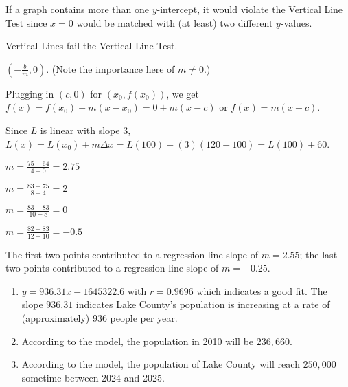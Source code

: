 \begin{exenum}
\item If a graph contains more than one $y$-intercept, it would violate the Vertical Line Test since $x=0$ would be matched with (at least) two different $y$-values.

\item  Vertical Lines fail the Vertical Line Test.

\item  $\left(- \frac{b}{m}, 0 \right)$.  (Note the importance here of $m \neq 0$.)

\item Plugging in $(c,0)$ for $(x_{0}, f(x_{0}))$, we get $f(x) = f(x_{0}) + m (x - x_{0}) = 0 + m(x-c)$ or $f(x) = m(x-c)$.

\item Since $L$ is linear with slope $3$, $L(x) = L(x_{0}) + m \Delta x = L(100) + (3)(120-100) = L(100)+60$.

\item


\begin{shortenumerate}

\item $m = \frac{75-64}{4-0} = 2.75$

\item $m = \frac{83-75}{8-4} = 2$


\item  $m = \frac{83-83}{10-8} = 0$

\item  $m = \frac{82-83}{12-10} = -0.5$

\end{shortenumerate}

The first two points contributed to a regression line slope of $m = 2.55$;  the last two points contributed to a regression line slope of $m=-0.25$.

\item  \begin{enumerate}

\item  $y = 936.31x - 1645322.6$ with $r=0.9696$ which indicates a good fit.  The slope $936.31$ indicates Lake County's population is increasing at a rate of (approximately) 936 people per year.

\item  According to the model, the population in 2010 will be $236, \!660$.

\item  According to the model, the population of Lake County will reach $250,\!000$ sometime between 2024 and 2025.


\end{enumerate}
\end{exenum}
